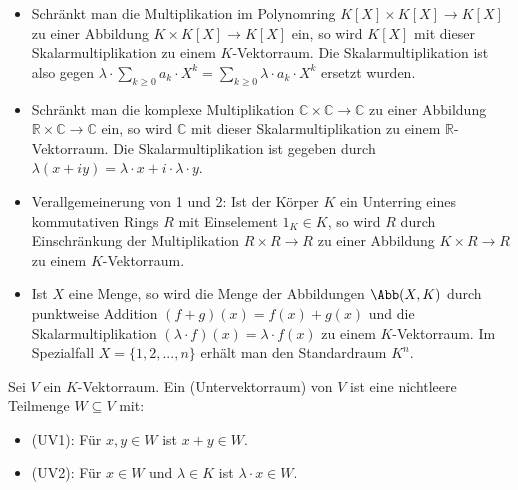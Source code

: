 \begin{example}
	\begin{itemize}
		\item Schränkt man die Multiplikation im Polynomring $K[X] \times K[X] \to K[X]$ zu einer Abbildung $K \times K[X]
		\to K[X]$ ein, so wird $K[X]$ mit dieser Skalarmultiplikation zu einem $K$-Vektorraum. Die Skalarmultiplikation ist also
		gegen $\lambda\cdot \sum _{k\ge 0} a_k\cdot X^k = \sum _{k\ge 0} \lambda\cdot a_k\cdot X^k$ ersetzt
		wurden.
		\item Schränkt man die komplexe Multiplikation $\mathbb C \times \mathbb C \to \mathbb C$ zu einer Abbildung 
		$\mathbb R \times \mathbb C \to \mathbb C$ ein, so wird $\mathbb C$ mit dieser Skalarmultiplikation zu einem
		$\mathbb R$-Vektorraum. Die Skalarmultiplikation ist gegeben durch $\lambda(x+iy)=\lambda\cdot x + i\cdot\lambda\cdot y$.
		\item Verallgemeinerung von 1 und 2: Ist der Körper $K$ ein Unterring eines kommutativen Rings $R$ mit Einselement 
		$1_K \in K$, so wird $R$ durch Einschränkung der Multiplikation $R \times R \to R$ zu einer Abbildung $K \times R
		\to R$ zu einem $K$-Vektorraum.
		\item Ist $X$ eine Menge, so wird die Menge der Abbildungen $\Abb(X,K)$ durch punktweise Addition $(f+g)(x)=f(x)+
		g(x)$ und die Skalarmultiplikation $(\lambda\cdot f)(x)=\lambda\cdot f(x)$ zu einem $K$-Vektorraum. Im Spezialfall
		$X=\{1,2,...,n\}$ erhält man den Standardraum $K^n$.
	\end{itemize}
\end{example}

\begin{definition}[Untervektorraum]
	Sei $V$ ein $K$-Vektorraum. Ein  (Untervektorraum) von $V$ ist eine nichtleere
	Teilmenge $W \subseteq V$ mit:
	\begin{itemize}
		\item (UV1): Für $x,y \in W$ ist $x+y\in W$.
		\item (UV2): Für $x \in W$ und $\lambda \in K$ ist $\lambda\cdot x\in W$.
	\end{itemize}
	
\end{definition}

